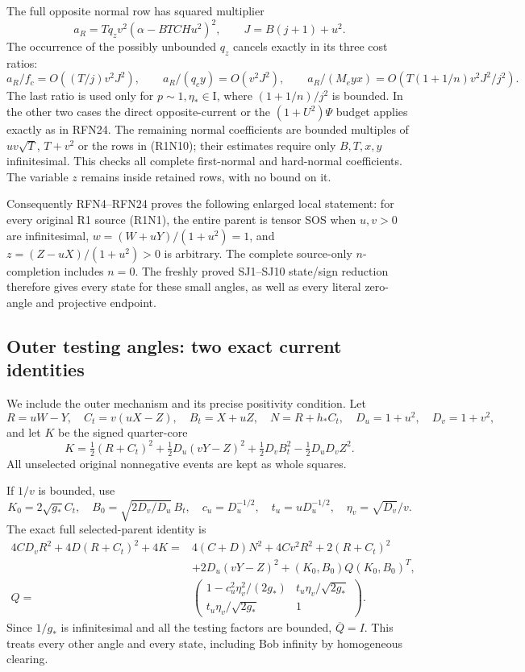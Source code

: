The full opposite normal row has squared multiplier
\[
 a_R=Tq_zv^2(\alpha-BTCHu^2)^2,\qquad
 J=B(j+1)+u^2 .
\]
The occurrence of the possibly unbounded $q_z$ cancels exactly in
its three cost ratios:
\[
 a_R/f_c=O((T/j)v^2J^2),\qquad
 a_R/(q_cy)=O(v^2J^2),\qquad
 a_R/(M_eyx)=O\!\left(T(1+1/n)v^2J^2/j^2\right).        \tag{R1N11}
\]
The last ratio is used only for $p\sim1,\eta_*\in\mathrm I$,
where $(1+1/n)/j^2$ is bounded.  In the other two cases the
direct opposite-current or the $(1+U^2)\Psi$ budget applies exactly
as in RFN24.  The remaining normal coefficients are bounded
multiples of $uv\sqrt T$, $T+v^2$ or the rows in (R1N10);
their estimates require only $B,T,x,y$ infinitesimal.
This checks all complete first-normal and hard-normal coefficients.
The variable $z$ remains inside retained rows, with no bound on it.

Consequently RFN4--RFN24 proves the following enlarged local statement:
for every original R1 source (R1N1), the entire parent is tensor SOS
when $u,v>0$ are infinitesimal, $w=(W+uY)/(1+u^2)=1$, and
$z=(Z-uX)/(1+u^2)>0$ is arbitrary.  The complete source-only
$n$-completion includes $n=0$.  The freshly proved SJ1--SJ10
state/sign reduction therefore gives every state for these small
angles, as well as every literal zero-angle and projective endpoint.

\subsection{Outer testing angles: two exact current identities}

We include the outer mechanism and its precise positivity condition.
Let
\[
 R=uW-Y,\quad C_t=v(uX-Z),\quad B_t=X+uZ,\quad
 N=R+h_*C_t,\quad D_u=1+u^2,\quad D_v=1+v^2,
\]
and let $K$ be the signed quarter-core
\[
 K=\tfrac12(R+C_t)^2+\tfrac12D_u(vY-Z)^2
             +\tfrac12D_v B_t^2-\tfrac12D_uD_vZ^2.       \tag{R1N12}
\]
All unselected original nonnegative events are kept as whole squares.

If $1/v$ is bounded, use
\[
 K_0=2\sqrt{g_*}C_t,\quad
 B_0=\sqrt{2D_v/D_u}\,B_t,\quad
 c_u=D_u^{-1/2},\quad t_u=uD_u^{-1/2},\quad
 \eta_v=\sqrt{D_v}/v .
\]
The exact full selected-parent identity is
\begin{align*}
 4CD_vR^2+4D(R+C_t)^2+4K
 ={}&4(C+D)N^2+4Cv^2R^2+2(R+C_t)^2\\
 &+2D_u(vY-Z)^2+(K_0,B_0)Q(K_0,B_0)^T,\\
 Q={}&
 \begin{pmatrix}
 1-c_u^2\eta_v^2/(2g_*)&t_u\eta_v/\sqrt{2g_*}\\
 t_u\eta_v/\sqrt{2g_*}&1
 \end{pmatrix}.
\tag{R1N13}
\end{align*}
Since $1/g_*$ is infinitesimal and all the testing factors are bounded,
$\overline Q=I$.  This treats every other angle and every state,
including Bob infinity by homogeneous clearing.

